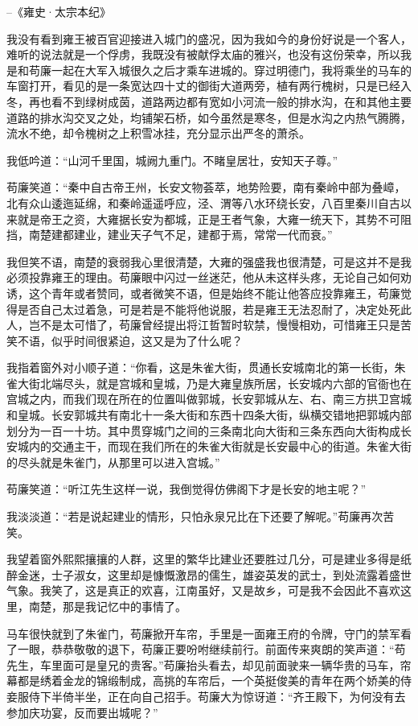 --《雍史·太宗本纪》

我没有看到雍王被百官迎接进入城门的盛况，因为我如今的身份好说是一个客人，难听的说法就是一个俘虏，我既没有被献俘太庙的雅兴，也没有这份荣幸，所以我是和苟廉一起在大军入城很久之后才乘车进城的。穿过明德门，我将乘坐的马车的车窗打开，看见的是一条宽达四十丈的御街大道两旁，植有两行槐树，只是已经入冬，再也看不到绿树成茵，道路两边都有宽如小河流一般的排水沟，在和其他主要道路的排水沟交叉之处，均铺架石桥，如今虽然是寒冬，但是水沟之内热气腾腾，流水不绝，却令槐树之上积雪冰挂，充分显示出严冬的萧杀。

我低吟道：“山河千里国，城阙九重门。不睹皇居壮，安知天子尊。”

苟廉笑道：“秦中自古帝王州，长安文物荟萃，地势险要，南有秦岭中部为叠嶂，北有众山逶迤延绵，和秦岭遥遥呼应，泾、渭等八水环绕长安，八百里秦川自古以来就是帝王之资，大雍据长安为都城，正是王者气象，大雍一统天下，其势不可阻挡，南楚建都建业，建业天子气不足，建都于焉，常常一代而衰。”

我但笑不语，南楚的衰弱我心里很清楚，大雍的强盛我也很清楚，可是这并不是我必须投靠雍王的理由。苟廉眼中闪过一丝迷茫，他从未这样头疼，无论自己如何劝诱，这个青年或者赞同，或者微笑不语，但是始终不能让他答应投靠雍王，苟廉觉得是否自己太过着急，可是若是不能将他说服，若是雍王无法忍耐了，决定处死此人，岂不是太可惜了，苟廉曾经提出将江哲暂时软禁，慢慢相劝，可惜雍王只是苦笑不语，似乎时间很紧迫，这又是为了什么呢？

我指着窗外对小顺子道：“你看，这是朱雀大街，贯通长安城南北的第一长街，朱雀大街北端尽头，就是宫城和皇城，乃是大雍皇族所居，长安城内六部的官衙也在宫城之内，而我们现在所在的位置叫做郭城，长安郭城从左、右、南三方拱卫宫城和皇城。长安郭城共有南北十一条大街和东西十四条大街，纵横交错地把郭城内部划分为一百一十坊。其中贯穿城门之间的三条南北向大街和三条东西向大街构成长安城内的交通主干，而现在我们所在的朱雀大街就是长安最中心的街道。朱雀大街的尽头就是朱雀门，从那里可以进入宫城。”

苟廉笑道：“听江先生这样一说，我倒觉得仿佛阁下才是长安的地主呢？”

我淡淡道：“若是说起建业的情形，只怕永泉兄比在下还要了解呢。”苟廉再次苦笑。

我望着窗外熙熙攘攘的人群，这里的繁华比建业还要胜过几分，可是建业多得是纸醉金迷，士子淑女，这里却是慷慨激昂的儒生，雄姿英发的武士，到处流露着盛世气象。我笑了，这是真正的欢喜，江南虽好，又是故乡，可是我不会因此不喜欢这里，南楚，那是我记忆中的事情了。

马车很快就到了朱雀门，苟廉掀开车帘，手里是一面雍王府的令牌，守门的禁军看了一眼，恭恭敬敬的退下，苟廉正要吩咐继续前行。前面传来爽朗的笑声道：“苟先生，车里面可是皇兄的贵客。”苟廉抬头看去，却见前面驶来一辆华贵的马车，帘幕都是绣着金龙的锦缎制成，高挑的车帘后，一个英挺俊美的青年在两个娇美的侍妾服侍下半倚半坐，正在向自己招手。苟廉大为惊讶道：“齐王殿下，为何没有去参加庆功宴，反而要出城呢？”

